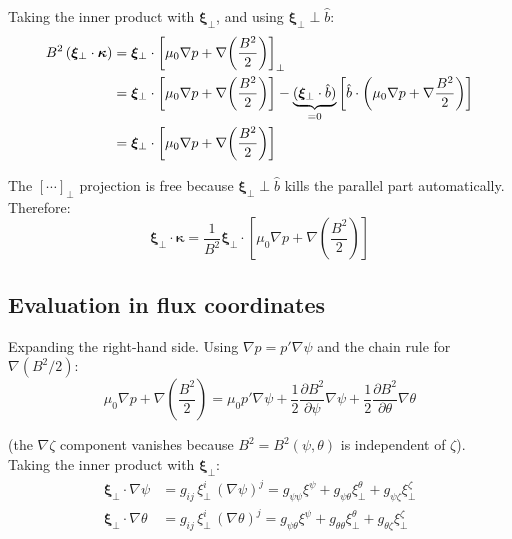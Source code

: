 \documentclass[12pt,a4paper]{article}
\newcommand{\bxi}{\boldsymbol{\xi}}
\begin{document}
Taking the inner product with $\bxi_\perp$, and using $\bxi_\perp\perp\hat{b}$:
\begin{align}
    B^2\,(\bxi_\perp\cdot\bm{\kappa})
    &= \bxi_\perp\cdot\left[\mu_0\nabla p + \nabla\!\left(\frac{B^2}{2}\right)\right]_\perp \notag\\
    &= \bxi_\perp\cdot\left[\mu_0\nabla p + \nabla\!\left(\frac{B^2}{2}\right)\right]
    - \underbrace{(\bxi_\perp\cdot\hat{b})}_{=0}\left[\hat{b}\cdot\left(\mu_0\nabla p + \nabla\frac{B^2}{2}\right)\right] \notag\\
    &= \bxi_\perp\cdot\left[\mu_0\nabla p + \nabla\!\left(\frac{B^2}{2}\right)\right]
\end{align}

The $[\cdots]_\perp$ projection is free because $\bxi_\perp\perp\hat{b}$ kills the parallel part automatically. Therefore:
\begin{equation}
    \boxed{
    \bxi_\perp\cdot\bm{\kappa} = \frac{1}{B^2}\bxi_\perp\cdot\!\left[\mu_0\nabla p + \nabla\!\left(\frac{B^2}{2}\right)\right]
    }
    \label{eq:xiperpkappa_direct}
\end{equation}

\subsection{Evaluation in flux coordinates}

Expanding the right-hand side. Using $\nabla p = p'\nabla\psi$ and the chain rule for $\nabla(B^2/2)$:
\begin{equation}
    \mu_0\nabla p + \nabla\!\left(\frac{B^2}{2}\right)
    = \mu_0 p'\nabla\psi + \frac{1}{2}\frac{\partial B^2}{\partial\psi}\nabla\psi + \frac{1}{2}\frac{\partial B^2}{\partial\theta}\nabla\theta
    \label{eq:V_expand}
\end{equation}

(the $\nabla\zeta$ component vanishes because $B^2 = B^2(\psi,\theta)$ is independent of $\zeta$). Taking the inner product with $\bxi_\perp$:
\begin{align}
    \bxi_\perp\cdot\nabla\psi &= g_{ij}\,\xi^i_\perp\,(\nabla\psi)^j
    = g_{\psi\psi}\xi^\psi + g_{\psi\theta}\xi^\theta_\perp + g_{\psi\zeta}\xi^\zeta_\perp
    \label{eq:xiperp_dpsi}\\[4pt]
    \bxi_\perp\cdot\nabla\theta &= g_{ij}\,\xi^i_\perp\,(\nabla\theta)^j
    = g_{\psi\theta}\xi^\psi + g_{\theta\theta}\xi^\theta_\perp + g_{\theta\zeta}\xi^\zeta_\perp
    \label{eq:xiperp_dtheta}
\end{align}
\end{document}
